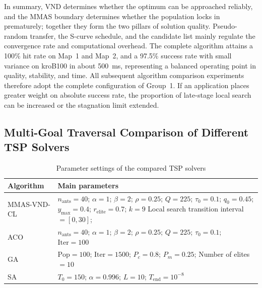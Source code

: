 In summary, VND determines whether the optimum can be approached reliably, and the MMAS boundary determines whether the population locks in prematurely; together they form the two pillars of solution quality. Pseudo-random transfer, the S-curve schedule, and the candidate list mainly regulate the convergence rate and computational overhead. The complete algorithm attains a 100\% hit rate on Map~1 and Map~2, and a 97.5\% success rate with small variance on kroB100 in about 500~ms, representing a balanced operating point in quality, stability, and time. All subsequent algorithm comparison experiments therefore adopt the complete configuration of Group~1. If an application places greater weight on absolute success rate, the proportion of late-stage local search can be increased or the stagnation limit extended.

\subsection{Multi-Goal Traversal Comparison of Different TSP Solvers}
\label{subsec:exp_cmp}

\begin{table}[!t]
\caption{Parameter settings of the compared TSP solvers}
\label{tab:tsp_params}
\centering
\scriptsize
\begin{tabular}{>{\centering\arraybackslash}m{} m{}}
\toprule
Algorithm & Main parameters \\
\midrule
MMAS-VND-CL & $n_{\mathrm{ants}}=40$;
$\alpha=1$;
$\beta=2$;\newline
$\rho=0.25$;
$Q=225$;
$\tau_0=0.1$;\newline
$q_0=0.45$;
$y_{\max}=0.4$;\newline
$r_{\mathrm{elite}}=0.7$;
$k=9$ \newline
Local search transition interval$=[0,30]$;\\
\midrule
ACO & $n_{\mathrm{ants}}=40$;
$\alpha=1$;
$\beta=2$;
$\rho=0.25$;\newline
$Q=225$;
$\tau_0=0.1$;
$\mathrm{Iter}=100$ \\
\midrule
GA & $\mathrm{Pop}=100$;
$\mathrm{Iter}=1500$;\newline
$P_c=0.8$;
$P_m=0.25$;\newline
Number of elites$=10$ \\
\midrule
SA & $T_0=150$;
$\alpha=0.996$;\newline
$L=10$;
$T_{\mathrm{end}}=10^{-8}$ \\
\bottomrule
\end{tabular}
\end{table}

